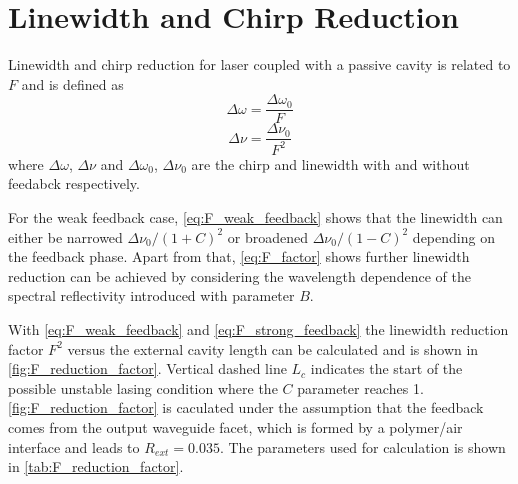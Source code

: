 \section{Linewidth and Chirp Reduction}\label{sec:linewidth_and_chirp_reduction}
Linewidth and chirp reduction for laser coupled with a passive cavity is related to $F$ and is defined as \cite{kazarinov1987relation, petermann2012laser}
\begin{equation}
    \Delta\omega=\frac{\Delta\omega_0}{F}
    \label{eq:chirp_reduction}
\end{equation}
\begin{equation}
    \Delta\nu=\frac{\Delta\nu_0}{F^2}
    \label{eq:linewidth_reduction}
\end{equation}
where $\Delta\omega$, $\Delta\nu$ and $\Delta\omega_0$, $\Delta\nu_0$ are the chirp and linewidth with and without feedabck respectively. 

For the weak feedback case, \autoref{eq:F_weak_feedback} shows that the linewidth can either be narrowed $\Delta\nu_0/(1+C)^2$ or broadened $\Delta\nu_0/(1-C)^2$ depending on the feedback phase. Apart from that, \autoref{eq:F_factor} shows further linewidth reduction can be achieved by considering the wavelength dependence of the spectral reflectivity introduced with parameter $B$.

With \autoref{eq:F_weak_feedback} and \autoref{eq:F_strong_feedback} the linewidth reduction factor $F^2$ versus the external cavity length can be calculated and is shown in \autoref{fig:F_reduction_factor}. Vertical dashed line $L_c$ indicates the start of the possible unstable lasing condition where the $C$ parameter reaches 1. \autoref{fig:F_reduction_factor} is caculated under the assumption that the feedback comes from the output waveguide facet, which is formed by a polymer/air interface and leads to $R_{ext}=0.035$. The parameters used for calculation is shown in \autoref{tab:F_reduction_factor}.


